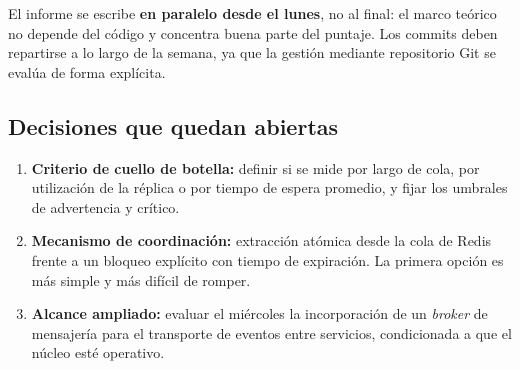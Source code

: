 \documentclass[11pt,a4paper]{article}
\begin{document}
\vspace{-4pt}
El informe se escribe \textbf{en paralelo desde el lunes}, no al final: el marco teórico no depende del código y concentra buena parte del puntaje. Los commits deben repartirse a lo largo de la semana, ya que la gestión mediante repositorio Git se evalúa de forma explícita.

\subsection{Decisiones que quedan abiertas}

\begin{enumerate}[leftmargin=1.1em, itemsep=1pt, topsep=2pt]
\item \textbf{Criterio de cuello de botella:} definir si se mide por largo de cola, por utilización de la réplica o por tiempo de espera promedio, y fijar los umbrales de advertencia y crítico.
\item \textbf{Mecanismo de coordinación:} extracción atómica desde la cola de Redis frente a un bloqueo explícito con tiempo de expiración. La primera opción es más simple y más difícil de romper.
\item \textbf{Alcance ampliado:} evaluar el miércoles la incorporación de un \emph{broker} de mensajería para el transporte de eventos entre servicios, condicionada a que el núcleo esté operativo.
\end{enumerate}
\end{document}
